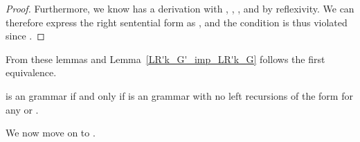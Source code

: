 \begin{isabellebody}
\begin{isamarkuptext}
\begin{lemma}
\begin{proof}
Furthermore, we know  has a derivation 
 with \isa{{\isasymalpha}\ {\isacharequal}{\kern0pt}\ {\isacharbrackleft}{\kern0pt}{\isacharbrackright}{\kern0pt}}, , 
, and  by reflexivity. We can therefore express the right sentential form 
 as , and the  condition is thus violated since .
\end{proof}
\end{lemma}

From these lemmas and Lemma~\ref{LR'k_G'_imp_LR'k_G} follows the first equivalence.

\begin{theorem}\label{G'_LR0_iff_G_LR0_lrec_free}
 is an  grammar if and only if  is an  grammar with no left recursions of the 
form  for any  or \isa{{\isasymalpha}}.
\end{theorem}

We now move on to .


\end{isamarkuptext}
\end{isabellebody}
